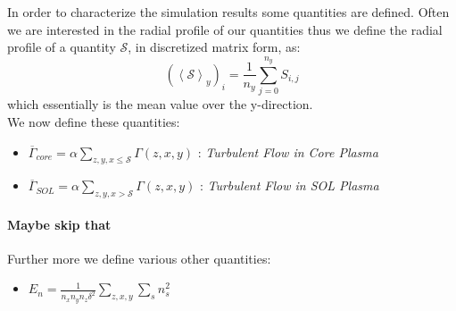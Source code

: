In order to characterize the simulation results some quantities are defined. Often we are interested in the radial profile of our quantities thus we define the radial profile of a quantity $\mathcal{S}$, in discretized matrix form, as:
\begin{equation}
    (\left<\mathcal{S}\right>_y)_i = \frac{1}{n_y} \sum_{j=0}^{n_y} S_{i, j}
\end{equation}
which essentially is the mean value over the y-direction.\\
We now define these quantities:

\begin{itemize}
    \item $\overline{\Gamma}_{core} = \alpha \sum_{z, y, x \leq \mathcal{S}} \Gamma(z,x,y)$ : \textit{Turbulent Flow in Core Plasma}
    \item $\overline{\Gamma}_{SOL} = \alpha \sum_{z, y, x > \mathcal{S}} \Gamma(z,x,y)$ : \textit{Turbulent Flow in SOL Plasma}
\end{itemize}
\paragraph{Maybe skip that}
Further more we define various other quantities:
\begin{itemize}
    \item $E_n = \frac{1}{n_x n_y n_z \delta^2}\sum_{z, x, y} \sum_s n_s^2$
\end{itemize}